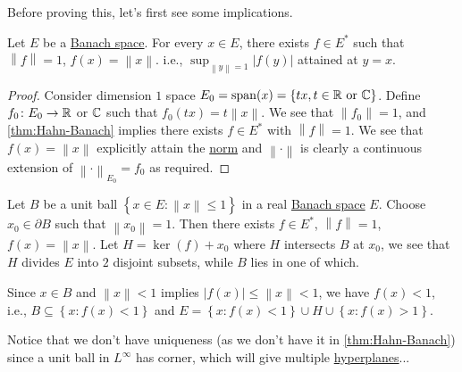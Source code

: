 Before proving this, let's first see some implications.

\begin{theorem}\label{thm:supporting-functional}
	Let \(E\) be a \hyperref[def:Banach-space]{Banach space}. For every \(x\in E\), there exists \(f\in E^{\ast} \)  such that \(\left\lVert f\right\rVert = 1\), \(f(x) = \left\lVert x\right\rVert \). i.e., \(\sup _{\left\lVert y\right\rVert = 1} \left\vert f(y) \right\vert \) attained at \(y = x\).
\end{theorem}
\begin{proof}
	Consider dimension \(1\) space \(E_0 = \mathop{\mathrm{span}}(x) = \left\{ tx,t\in \mathbb{\MakeUppercase{r}} \text{ or }\mathbb{\MakeUppercase{c}}   \right\} \). Define \(f_0\colon E_0 \to \mathbb{\MakeUppercase{r}} \) or \(\mathbb{\MakeUppercase{c}} \) such that \(f_0(tx) = t \left\lVert x\right\rVert \). We see that \(\left\lVert f_0\right\rVert = 1\), and \autoref{thm:Hahn-Banach} implies there exists \(f\in E^{\ast} \) with \(\left\lVert f\right\rVert = 1\). We see that \(f(x) = \left\lVert x\right\rVert \) explicitly attain the \hyperref[def:norm]{norm} and \(\left\lVert \cdot \right\rVert \) is clearly a continuous extension of \(\left\lVert \cdot \right\rVert _{E_0}= f_0\) as required.
\end{proof}

\begin{remark}
	Let \(B\) be a unit ball \(\left\{ x\in E \colon \left\lVert x\right\rVert \leq 1\right\} \) in a real \hyperref[def:Banach-space]{Banach space} \(E\). Choose \(x_0 \in \partial B\) such that \(\left\lVert x_0\right\rVert = 1\). Then there exists \(f\in E^{\ast} \), \(\left\lVert f\right\rVert = 1\), \(f(x) = \left\lVert x\right\rVert \). Let \(H = \ker(f) + x_0\) where \(H\) intersects \(B\) at \(x_0\), we see that \(H\) divides \(E\) into \(2\) disjoint subsets, while \(B\) lies in one of which.
\end{remark}
\begin{explanation}
	Since \(x\in B\) and \(\left\lVert x\right\rVert < 1\) implies \(\left\vert f(x) \right\vert \leq \left\lVert x\right\rVert < 1\), we have \(f(x) < 1\), i.e., \(B\subseteq \left\{ x\colon f(x) < 1 \right\} \) and \(E = \left\{ x\colon f(x) < 1 \right\} \cup H \cup \left\{ x\colon f(x) > 1 \right\}\).
\end{explanation}

\begin{note}
	Notice that we don't have uniqueness (as we don't have it in \autoref{thm:Hahn-Banach}) since a unit ball in \(L^{\infty } \) has corner, which will give multiple \hyperref[def:hyperplane]{hyperplanes}...
\end{note}